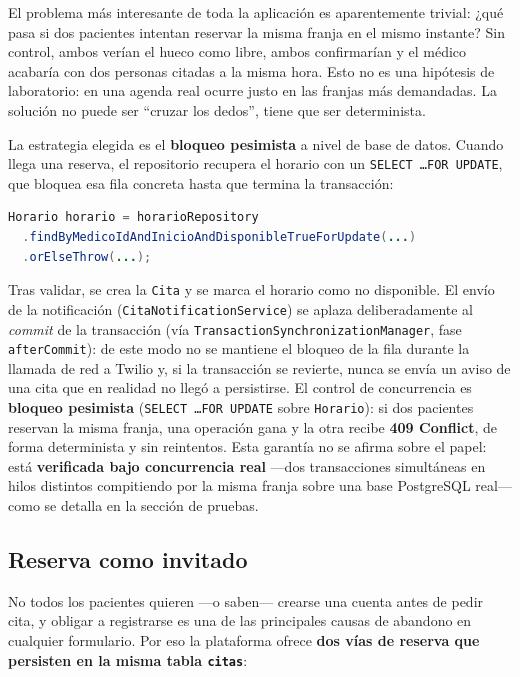 \documentclass[12pt,a4paper]{report}
\begin{document}
El problema más interesante de toda la aplicación es aparentemente trivial: ¿qué pasa si dos pacientes intentan reservar la misma franja en el mismo instante? Sin control, ambos verían el hueco como libre, ambos confirmarían y el médico acabaría con dos personas citadas a la misma hora. Esto no es una hipótesis de laboratorio: en una agenda real ocurre justo en las franjas más demandadas. La solución no puede ser ``cruzar los dedos'', tiene que ser determinista.

La estrategia elegida es el \textbf{bloqueo pesimista} a nivel de base de datos. Cuando llega una reserva, el repositorio recupera el horario con un \texttt{SELECT \ldots FOR UPDATE}, que bloquea esa fila concreta hasta que termina la transacción:

\begin{lstlisting}[language=Java]
Horario horario = horarioRepository
  .findByMedicoIdAndInicioAndDisponibleTrueForUpdate(...)
  .orElseThrow(...);
\end{lstlisting}

Tras validar, se crea la \texttt{Cita} y se marca el horario como no disponible. El envío de la notificación (\texttt{CitaNotificationService}) se aplaza deliberadamente al \emph{commit} de la transacción (vía \texttt{TransactionSynchronizationManager}, fase \texttt{afterCommit}): de este modo no se mantiene el bloqueo de la fila durante la llamada de red a Twilio y, si la transacción se revierte, nunca se envía un aviso de una cita que en realidad no llegó a persistirse. El control de concurrencia es \textbf{bloqueo pesimista} (\texttt{SELECT \ldots FOR UPDATE} sobre \texttt{Horario}): si dos pacientes reservan la misma franja, una operación gana y la otra recibe \textbf{409 Conflict}, de forma determinista y sin reintentos. Esta garantía no se afirma sobre el papel: está \textbf{verificada bajo concurrencia real} —dos transacciones simultáneas en hilos distintos compitiendo por la misma franja sobre una base PostgreSQL real— como se detalla en la sección de pruebas.



\subsection{Reserva como invitado}

No todos los pacientes quieren —o saben— crearse una cuenta antes de pedir cita, y obligar a registrarse es una de las principales causas de abandono en cualquier formulario. Por eso la plataforma ofrece \textbf{dos vías de reserva que persisten en la misma tabla \texttt{citas}}:
\end{document}
